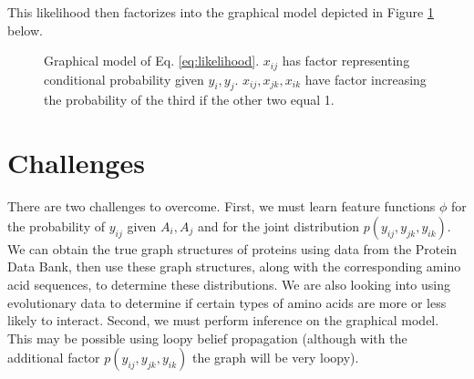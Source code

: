 \documentclass{article}
\begin{document}
This likelihood then factorizes into the graphical model depicted in Figure \ref{fig:model} below.
\begin{figure}[H]
\centering
{}
\caption{Graphical model of Eq. \ref{eq:likelihood}. $x_{ij}$ has factor representing conditional probability given $y_i, y_j$. $x_{ij}, x_{jk}, x_{ik}$ have factor increasing the probability of the third if the other two equal 1.}
\label{fig:model}
\end{figure}

\section{Challenges}
There are two challenges to overcome. First, we must learn feature functions $\phi$ for the probability of $y_{ij}$ given $A_i, A_j$ and for the joint distribution $p(y_{ij}, y_{jk}, y_{ik})$. We can obtain the true graph structures of proteins using data from the Protein Data Bank, then use these graph structures, along with the corresponding amino acid sequences, to determine these distributions. We are also looking into using evolutionary data to determine if certain types of amino acids are more or less likely to interact. Second, we must perform inference on the graphical model. This may be possible using loopy belief propagation (although with the additional factor $p(y_{ij}, y_{jk}, y_{ik})$ the graph will be very loopy).
\end{document}
